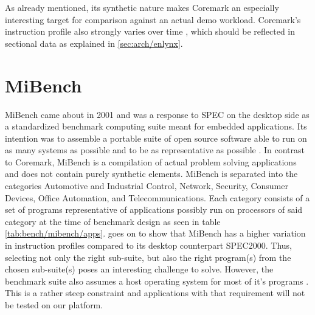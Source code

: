 \documentclass[../bachelor_paper.tex]{subfiles}
\begin{document}
As already mentioned, its synthetic nature makes Coremark an especially interesting target for comparison against an actual demo workload. Coremark's instruction profile also strongly varies over time \cite{gal-onExploringCoremarkBenchmark2012}, which should be reflected in sectional data as explained in \ref{sec:arch/enlynx}.

\section{MiBench}
    \label{sec:bench:mibench}
MiBench came about in 2001 and was a response to \acs{SPEC} on the desktop side as a standardized benchmark computing suite meant for embedded applications. Its intention was to assemble a portable suite of open source software able to run on as many systems as possible and to be as representative as possible \cite{guthausMiBenchFreeCommercially2001}. In contrast to Coremark, MiBench is a compilation of actual problem solving applications and does not contain purely synthetic elements. MiBench is separated into the categories Automotive and
Industrial Control, Network, Security, Consumer Devices, Office Automation, and Telecommunications. Each category consists of a set of programs representative of applications possibly run on processors of said category at the time of benchmark design as seen in table \ref{tab:bench/mibench/apps}. \cite{guthausMiBenchFreeCommercially2001} goes on to show that MiBench has a higher variation in instruction profiles compared to its desktop counterpart \acs{SPEC}2000. Thus, selecting not only the right sub-suite, but also the right program(s) from the chosen sub-suite(s) poses an interesting challenge to solve. However, the benchmark suite also assumes a host operating system for most of it's programs \cite{pallisterBEEBSOpenBenchmarks2013}. This is a rather steep constraint and applications with that requirement will not be tested on our platform.
\end{document}
